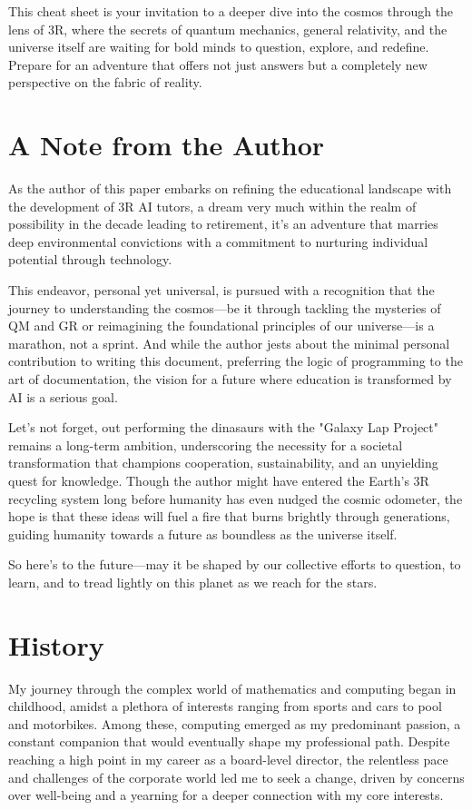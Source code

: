 \documentclass[12pt]{article}
\begin{document}
This cheat sheet is your invitation to a deeper dive into the cosmos through the lens of 3R, where the secrets of quantum mechanics, general relativity, and the universe itself are waiting for bold minds to question, explore, and redefine. Prepare for an adventure that offers not just answers but a completely new perspective on the fabric of reality.

\section*{A Note from the Author}

As the author of this paper embarks on refining the educational landscape with the development of 3R AI tutors, a dream very much within the realm of possibility in the decade leading to retirement, it's an adventure that marries deep environmental convictions with a commitment to nurturing individual potential through technology.

This endeavor, personal yet universal, is pursued with a recognition that the journey to understanding the cosmos—be it through tackling the mysteries of QM and GR or reimagining the foundational principles of our universe—is a marathon, not a sprint. And while the author jests about the minimal personal contribution to writing this document, preferring the logic of programming to the art of documentation, the vision for a future where education is transformed by AI is a serious goal.

Let's not forget, out performing the dinasaurs with the "Galaxy Lap Project" remains a long-term ambition, underscoring the necessity for a societal transformation that champions cooperation, sustainability, and an unyielding quest for knowledge. Though the author might have entered the Earth's 3R recycling system long before humanity has even nudged the cosmic odometer, the hope is that these ideas will fuel a fire that burns brightly through generations, guiding humanity towards a future as boundless as the universe itself.

So here's to the future—may it be shaped by our collective efforts to question, to learn, and to tread lightly on this planet as we reach for the stars.

\section*{History}
My journey through the complex world of mathematics and computing began in childhood, amidst a plethora of interests ranging from sports and cars to pool and motorbikes. Among these, computing emerged as my predominant passion, a constant companion that would eventually shape my professional path. Despite reaching a high point in my career as a board-level director\cite{Ed2002DNA}, the relentless pace and challenges of the corporate world led me to seek a change, driven by concerns over well-being and a yearning for a deeper connection with my core interests.
\end{document}
